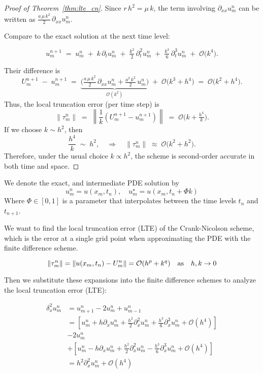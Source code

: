 \begin{proof}[Proof of Theorem~\ref{thm:lte_cn}]
  Since $r\,h^2 = \mu\,k$, the term involving $\partial_{xx} u_m^n$ can be written as
  $\tfrac{a\,\mu\,k^2}{2}\,\partial_{xx}u_m^n$.

  Compare to the exact solution at the next time level:

  \[
    u_m^{n+1}
    \;=\; u_m^n
    \;+\; k\,\partial_t u_m^n
    \;+\; \tfrac{k^2}{2}\,\partial_t^2 u_m^n
    \;+\; \tfrac{k^3}{6}\,\partial_t^3 u_m^n
    \;+\; \mathcal{O}\bigl(k^4\bigr).
  \]

  Their difference is
  \[
    U_m^{n+1} \;-\; u_m^{n+1}
    \;=\;
    \underbrace{\bigl(\tfrac{a\,\mu\,k^2}{2}\,\partial_{xx}u_m^n
      + \tfrac{a^2\,k^2}{2}\,u_m^n\bigr)}_{\mathcal{O}(k^2)}
    \;+\; \mathcal{O}\bigl(k^3 + h^4\bigr)
    \;=\; \mathcal{O}\bigl(k^2 + h^4\bigr).
  \]
  Thus, the local truncation error (per time step) is
  \[
    \lVert{\tau_m^n}\rVert
    \;=\; \left\lVert\dfrac{1}{k}\left(U_m^{n+1} - u_m^{n+1}\right) \right\rVert
    \;=\; \mathcal{O}\bigl(k + \tfrac{h^4}{k}\bigr).
  \]
  If we choose $k \sim h^2$, then
  \[
    \frac{h^4}{k} \;\sim\; h^2,
    \quad
    \Rightarrow
    \quad
    \lVert{\tau_m^n}\rVert \;\approx\; \mathcal{O}\bigl(k^2 + h^2\bigr).
  \]
  Therefore, under the usual choice $k \propto h^2$, the scheme is second-order accurate in both time and space.

\end{proof}




We denote the exact, and intermediate PDE solution by
\[
  u_m^n = u(x_m, t_n), \quad u_m^\star = u(x_m, t_n + \Phi k)
\]
Where \(\Phi \in [0, 1]\) is a parameter that interpolates between the time levels \(t_n\) and \(t_{n+1}\).

We want to find the local truncation error (LTE) of the Crank-Nicolson scheme, which is the error at a single grid point when approximating the PDE with the finite difference scheme.

\[
  \lVert\tau_m^n\rVert = \lVert u(x_m, t_n) - U_m^n\rVert = \mathcal{O}(h^p + k^q) \quad \text{as} \quad h, k \to 0
\]

Then we substitute these expansions into the finite difference schemes to analyze the local truncation error (LTE):

\begin{align*}
  \delta_x^2 u_m^n & = u_{m+1}^n - 2 u_m^n + u_{m-1}^n                                                                                                    \\
                   & = \left[ u_m^n + h \partial_x u_m^n + \frac{h^2}{2} \partial_x^2 u_m^n + \frac{h^3}{6} \partial_x^3 u_m^n + \mathcal{O}(h^4) \right] \\
                   & - 2 u_m^n                                                                                                                            \\
                   & + \left[ u_m^n - h \partial_x u_m^n + \frac{h^2}{2} \partial_x^2 u_m^n - \frac{h^3}{6} \partial_x^3 u_m^n + \mathcal{O}(h^4) \right] \\
                   & = h^2 \partial_x^2 u_m^n + \mathcal{O}(h^4)
\end{align*}

